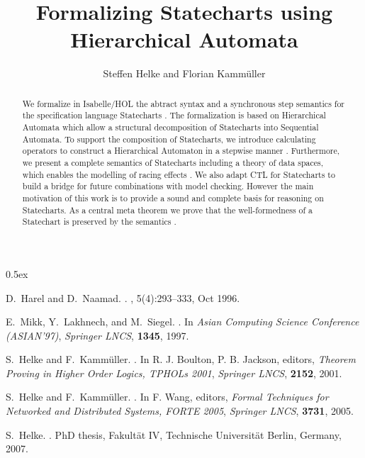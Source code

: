\documentclass[11pt,a4paper]{article}
\begin{document}
\title{Formalizing Statecharts using Hierarchical Automata}
\author{Steffen Helke and Florian Kamm\"uller}
\maketitle

\begin{abstract}
We formalize in Isabelle/HOL the abtract syntax and a synchronous step
semantics for the specification language Statecharts \cite{HN96}. The
formalization is based on Hierarchical Automata \cite{MLS97} 
which allow a structural decomposition of Statecharts into Sequential
Automata. To support the composition of Statecharts, we introduce 
calculating operators to construct a Hierarchical Automaton in a 
stepwise manner \cite{HK01}. Furthermore, we present a complete
semantics of Statecharts including a theory of data spaces, which enables 
the modelling of racing effects \cite{HK05}. We also adapt CTL for 
Statecharts to build a bridge for future combinations with
model checking. However the main motivation of this work is to provide a 
sound and complete basis for reasoning on
Statecharts. As a central meta theorem we prove that the 
well-formedness of a Statechart is preserved by the 
semantics \cite{Hel07}.    
\end{abstract}

\tableofcontents

\parindent 0pt\parskip 0.5ex





\begin{thebibliography}{MLSH99}

D.~Harel and D.~Naamad.
.
,
  5(4):293--333, Oct 1996.

E.~Mikk, Y.~Lakhnech, and M.~Siegel.
.
\newblock In {\em Asian Computing Science Conference (ASIAN'97)},
\newblock \textit{Springer LNCS}, \textbf{1345}, 1997.
 
S.~Helke and F.~Kamm{\"u}ller.
.
\newblock In R. J. Boulton, P. B. Jackson, editors, {\em Theorem
Proving in Higher Order Logics, TPHOLs 2001}, \textit{Springer LNCS},
\textbf{2152}, 2001.

S.~Helke and F.~Kamm{\"u}ller.
.
\newblock In F. Wang, editors, {\em  Formal Techniques
  for Networked and Distributed Systems, FORTE 2005}, \textit{Springer LNCS},
\textbf{3731}, 2005.

S.~Helke.
.
\newblock PhD thesis, Fakult{\"a}t IV, Technische Universit{\"a}t Berlin, Germany, 2007.

\end{thebibliography}
\end{document}
